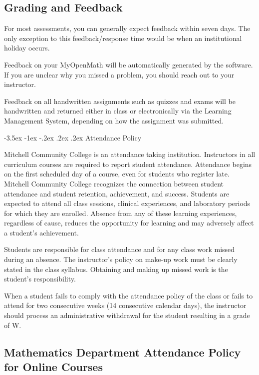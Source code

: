 \documentclass{article}
\makeatletter
\renewcommand\section{\@startsection{section}{1}{0pt}%
  {-3.5ex \@plus -1ex \@minus -.2ex}%
  {.2ex \@plus.2ex}%
  {\normalfont\Large\bfseries}} %
\makeatother
\begin{document}
\subsection{Grading and Feedback}

For most assessments, you can generally expect feedback within seven days. The only exception to this feedback/response time would be when an institutional holiday occurs.

Feedback on your MyOpenMath will be automatically generated by the software. If you are unclear why you missed a problem, you should reach out to your instructor.

Feedback on all handwritten assignments such as quizzes and exams will be handwritten and returned either in class or electronically via the Learning Management System, depending on how the assignment was submitted.

\section{Attendance Policy}

Mitchell Community College is an attendance taking institution. Instructors in all curriculum courses are required to report student attendance. Attendance begins on the first scheduled day of a course, even for students who register late. Mitchell Community College recognizes the connection between student attendance and student retention, achievement, and success. Students are expected to attend all class sessions, clinical experiences, and laboratory periods for which they are enrolled. Absence from any of these learning experiences, regardless of cause, reduces the opportunity for learning and may adversely affect a student's achievement.

Students are responsible for class attendance and for any class work missed during an absence. The instructor's policy on make-up work must be clearly stated in the class syllabus. Obtaining and making up missed work is the student's responsibility.

When a student fails to comply with the attendance policy of the class or fails to attend for two consecutive weeks (14 consecutive calendar days), the instructor should process an administrative withdrawal for the student resulting in a grade of W.

\subsection{Mathematics Department Attendance Policy for Online Courses}
\end{document}
